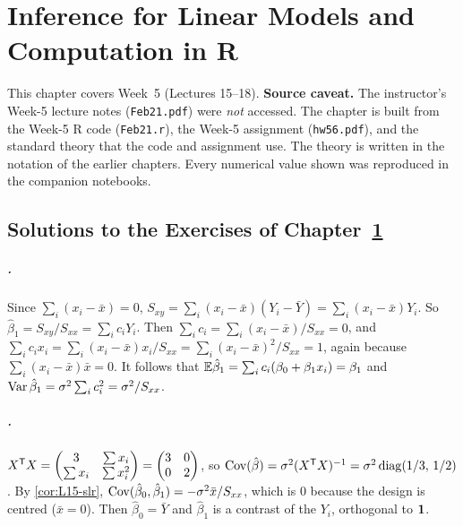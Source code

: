 \chapter{Inference for Linear Models and Computation in R}\label{ch:week05}

This chapter covers Week~5 (Lectures 15--18). \textbf{Source caveat.} The instructor's Week-5 lecture notes
(\texttt{Feb21.pdf}) were \emph{not} accessed. The chapter is built from the Week-5 R code (\texttt{Feb21.r}), the
Week-5 assignment (\texttt{hw56.pdf}), and the standard theory that the code and assignment use. The theory is written
in the notation of the earlier chapters. Every numerical value shown was reproduced in the companion notebooks.






\section*{Solutions to the Exercises of Chapter~\ref{ch:week05}}

\paragraph{.}
Since $\sum_i(x_i-\bar x)=0$, $S_{xy}=\sum_i(x_i-\bar x)(Y_i-\bar Y)=\sum_i(x_i-\bar x)Y_i$. So
$\hat\beta_1=S_{xy}/S_{xx}=\sum_ic_iY_i$. Then $\sum_ic_i=\sum_i(x_i-\bar x)/S_{xx}=0$, and
$\sum_ic_ix_i=\sum_i(x_i-\bar x)x_i/S_{xx}=\sum_i(x_i-\bar x)^2/S_{xx}=1$, again because $\sum_i(x_i-\bar x)\bar x=0$.
It follows that $\mathbb E\hat\beta_1=\sum_ic_i(\beta_0+\beta_1x_i)=\beta_1$ and $\operatorname{Var}\hat\beta_1=\sigma^2\sum_ic_i^2=\sigma^2/S_{xx}$.

\paragraph{.}
$X^{\mathsf T} X=\begin{pmatrix}3&\sum x_i\\\sum x_i&\sum x_i^2\end{pmatrix}=\begin{pmatrix}3&0\\0&2\end{pmatrix}$, so
$\operatorname{Cov}(\hat\beta)=\sigma^2(X^{\mathsf T} X)^{-1}=\sigma^2\operatorname{diag}(1/3,\,1/2)$. By \cref{cor:L15-slr},
$\operatorname{Cov}(\hat\beta_0,\hat\beta_1)=-\sigma^2\bar x/S_{xx}$, which is $0$ because the design is centred ($\bar x=0$). Then
$\hat\beta_0=\bar Y$ and $\hat\beta_1$ is a contrast of the $Y_i$, orthogonal to $\mathbf 1$.

